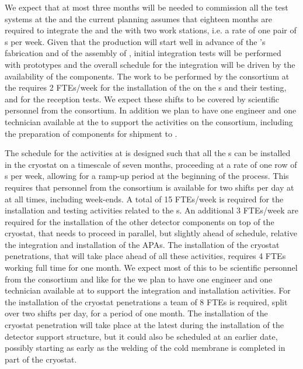 We expect that at most three months will be needed to commission
all the test systems at the  and the current planning
assumes that eighteen months are required to integrate the 
and the  with two work stations, i.e.
a rate of one pair of s per week. Given that the 
production will start well in advance of the 's fabrication
and of the assembly of , initial integration tests will 
be performed with  prototypes and the overall schedule
for the integration will be driven by the availability of the 
components. The work to be performed by the 
consortium at the  requires 2 FTEs/week for the installation 
of the  on the s and their testing, and for 
the  reception tests. We expect these shifts to be covered 
by scientific personnel from the  consortium. In addition 
we plan to have one engineer and one technician available at the 
 to support the activities on the consortium, including 
the preparation of components for shipment to \surf.

The schedule for the activities at \surf is designed such that all the
s can be installed in the cryostat on a timescale of seven
months, proceeding at a rate of one row of s per week, allowing
for a ramp-up period at the beginning of the process. This
requires that personnel from the  consortium is available
for two shifts per day at \surf at all times, including week-ends. A
total of 15 FTEs/week is required for the installation and testing 
activities related to the s. An additional 3 FTEs/week are
required for the installation of the other detector components on
top of the cryostat, that needs to proceed in parallel, but slightly
ahead of schedule, relative the integration and installation of the
APAs. The installation of the cryostat penetrations, that will take
place ahead of all these activities, requires 4 FTEs working full time
for one month. We expect most of this to be scientific personnel from
the  consortium and like for the  we plan
to have one engineer and one technician available at \surf to support
the integration and installation activities. For the installation of
the cryostat penetrations a team of 8 FTEs is required, split over
two shifts per day, for a period of one month. The installation of
the cryostat penetration will take place at the latest during the 
installation of the detector support structure, but it could also be
scheduled at an earlier date, possibly starting as early
as the welding of the cold membrane is completed in part of the cryostat.

